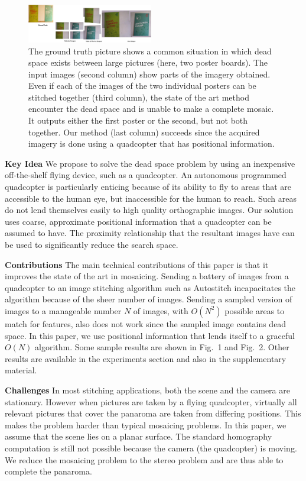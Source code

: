 \documentclass[10pt,twocolumn,letterpaper]{article}
\begin{document}
\begin{figure}[t!]
  \centering
  \includegraphics[width=0.49\textwidth]{figures/teaser2}
  \caption{ \label{fig:teaser} The ground truth picture shows a common
    situation in which dead space exists between large pictures (here,
    two poster boards). The input images (second column) show parts of
    the imagery obtained. Even if each of the images of the two
    individual posters can be stitched together (third column), the
    state of the art method encounter the dead space and is unable to
    make a complete mosaic.  It outputs either the first poster or the
    second, but not both together.  Our method (last column) succeeds
    since the acquired imagery is done using a quadcopter that has
    positional information.}
\end{figure}

{\bf Key Idea} We propose to solve the dead space problem by
using an inexpensive off-the-shelf flying device, such as a
quadcopter.  An autonomous programmed quadcopter is particularly
enticing because of its ability to fly to areas that are accessible to
the human eye, but inaccessible for the human to reach.  Such areas do not lend
themselves easily to high quality orthographic images. Our solution
uses coarse, approximate positional information that a quadcopter
can be assumed to have.  The proximity relationship that the resultant
images have can be used to significantly reduce the search space. 

{\bf Contributions} The main technical contributions of this paper is
that it improves the state of the art in mosaicing.  Sending a battery
of images from a quadcopter to an image stitching algorithm such as
Autostitch incapacitates the algorithm because of the sheer number of
images. Sending a sampled version of images to a manageable number $N$
of images, with $O(N^2)$ possible areas to match for features, also
does not work since the sampled image contains dead space.  In this
paper, we use positional information that lends itself to a graceful
$O(N)$ algorithm.  Some sample results are shown in Fig.\ 1 and Fig.\ 2.
Other results are available in the experiments section and also in the
supplementary material.

{\bf Challenges} In most stitching applications, both the scene and
the camera are stationary.  However when pictures are taken by a
flying quadcopter, virtually all relevant pictures that cover the
panaroma are taken from differing positions.  This makes the problem
harder than typical mosaicing problems.  In this paper, we assume that
the scene lies on a planar surface. The standard homography
computation is still not possible because the camera (the quadcopter)
is moving. We reduce the mosaicing problem to the stereo problem and
are thus able to complete the panaroma.
\end{document}
